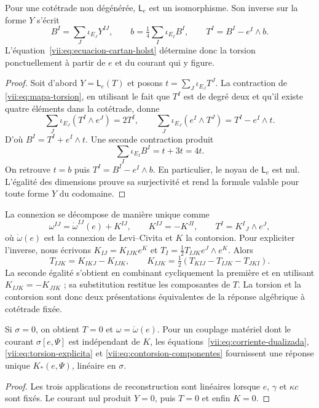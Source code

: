 \begin{theorem}
\label{vii:thm:inversion-torsion}
Pour une cotétrade non dégénérée, \(\mathsf L_e\) est un isomorphisme.
Son inverse sur la forme \(Y\) s'écrit
\begin{equation}
 B^I=\sum_J\iota_{E_J}Y^{IJ},\qquad
 b=\tfrac14\sum_I\iota_{E_I}B^I,\qquad
 T^I=B^I-e^I\wedge b.
 \label{vii:eq:torsion-explicita}
\end{equation}
L'équation~\eqref{vii:eq:ecuacion-cartan-holst} détermine donc
la torsion ponctuellement à partir de \(e\) et du courant qui y
figure.
\end{theorem}
\begin{proof}
Soit d'abord \(Y=\mathsf L_e(T)\) et posons
\(t=\sum_J\iota_{E_J}T^J\). La contraction de
\eqref{vii:eq:mapa-torsion}, en utilisant le fait que \(T^I\) est de degré deux
et qu'il existe quatre éléments dans la cotétrade, donne
\[
 \sum_J\iota_{E_J}(T^I\wedge e^J)=2T^I,
 \qquad
 \sum_J\iota_{E_J}(e^I\wedge T^J)=T^I-e^I\wedge t.
\]
D'où \(B^I=T^I+e^I\wedge t\). Une seconde contraction produit
\[
 \sum_I\iota_{E_I}B^I=t+3t=4t.
\]
On retrouve \(t=b\) puis \(T^I=B^I-e^I\wedge b\).
En particulier, le noyau de \(\mathsf L_e\) est nul. L'égalité
des dimensions prouve sa surjectivité et rend la formule valable
pour toute forme \(Y\) du codomaine.
\end{proof}

La connexion se décompose de manière unique comme
\begin{equation}
 \omega^{IJ}=\mathring\omega^{IJ}(e)+K^{IJ},\qquad
 K^{IJ}=-K^{JI},\qquad T^I=K^I{}_{J}\wedge e^J,
 \label{vii:eq:contorsion}
\end{equation}
où \(\mathring\omega(e)\) est la connexion de Levi--Civita et \(K\) la contorsion. Pour expliciter l'inverse, nous écrivons \(K_{IJ}=K_{IJK}e^K\) et \(T_I=\tfrac12T_{IJK}e^J\wedge e^K\). Alors
\begin{equation}
 T_{IJK}=K_{IKJ}-K_{IJK},\qquad
 K_{IJK}=\tfrac12(T_{KIJ}-T_{IJK}-T_{JKI}).
 \label{vii:eq:contorsion-componentes}
\end{equation}
La seconde égalité s'obtient en combinant cycliquement la première et
en utilisant \(K_{IJK}=-K_{JIK}\) ; sa substitution restitue les composantes
de \(T\). La torsion et la contorsion sont donc deux
présentations équivalentes de la réponse algébrique à cotétrade fixée.

\begin{corollary}
\label{vii:cor:desacoplamiento-torsional}
Si \(\sigma=0\), on obtient \(T=0\) et \(\omega=\mathring\omega(e)\). Pour un couplage matériel dont le courant \(\sigma[e,\Psi]\) est indépendant de \(K\), les équations~\eqref{vii:eq:corriente-dualizada}, \eqref{vii:eq:torsion-explicita} et \eqref{vii:eq:contorsion-componentes} fournissent une réponse unique \(K_*(e,\Psi)\), linéaire en \(\sigma\).
\end{corollary}
\begin{proof}
Les trois applications de reconstruction sont linéaires lorsque \(e\),
\(\gamma\) et \(\kappa c\) sont fixés. Le courant nul produit
\(Y=0\), puis \(T=0\) et enfin \(K=0\).
\end{proof}

